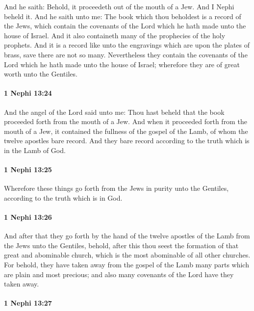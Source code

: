 			And he saith:
			Behold, it proceedeth out of the mouth of a Jew.
			And I Nephi beheld it.
			And he saith unto me:
			The book which thou beholdest is a record of the Jews,
			which contain the covenants of the Lord
			which he hath made unto the house of Israel.
			And it also containeth many of the prophecies of the holy prophets.
			And it is a record like unto the engravings
			which are upon the plates of brass,
			save there are not so many.
			Nevertheless they contain the covenants of the Lord
			which he hath made unto the house of Israel;
			wherefore they are of great worth unto the Gentiles.

		\paragraph{1 Nephi 13:24} %
			\label{1NEPHI-13-24}

			And the angel of the Lord said unto me:
			Thou hast beheld that the book proceeded forth from the mouth of a Jew.
			And when it proceeded forth from the mouth of a Jew,
			it contained the fullness of the gospel of the Lamb,
			of whom the twelve apostles bare record.
			And they bare record according to the truth which is in the Lamb of God.

		\paragraph{1 Nephi 13:25} %
			\label{1NEPHI-13-25}

			Wherefore these things go forth from the Jews in purity unto the Gentiles,
			according to the truth which is in God.

		\paragraph{1 Nephi 13:26} %
			\label{1NEPHI-13-26}

			And after that they go forth by the hand of the twelve apostles of the Lamb
			from the Jews unto the Gentiles,
			behold, after this thou seest the formation of that great and abominable church,
			which is the most abominable of all other churches.
			For behold, they have taken away from the gospel of the Lamb
			many parts which are plain and most precious;
			and also many covenants of the Lord have they taken away.

		\paragraph{1 Nephi 13:27} %
			\label{1NEPHI-13-27}

